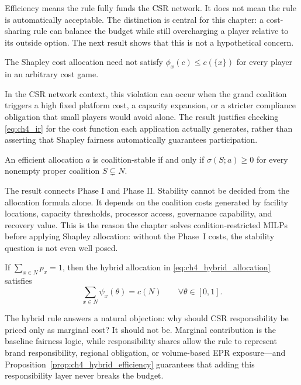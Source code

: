 Efficiency means the rule fully funds the CSR network. It does not mean the rule is automatically acceptable. The distinction is central for this chapter: a cost-sharing rule can balance the budget while still overcharging a player relative to its outside option. The next result shows that this is not a hypothetical concern.

\begin{proposition}
\label{prop:ch4_ir_not_automatic}
The Shapley cost allocation need not satisfy $\phi_x(c)\leq c(\{x\})$ for every player in an arbitrary cost game.
\end{proposition}

In the CSR network context, this violation can occur when the grand coalition triggers a high fixed platform cost, a capacity expansion, or a stricter compliance obligation that small players would avoid alone. The result justifies checking \eqref{eq:ch4_ir} for the cost function each application actually generates, rather than asserting that Shapley fairness automatically guarantees participation.

\begin{proposition}
\label{prop:ch4_core_depends_phase1}
An efficient allocation $a$ is coalition-stable if and only if $\sigma(S;a)\geq 0$ for every nonempty proper coalition $S\subsetneq N$.
\end{proposition}

The result connects Phase I and Phase II. Stability cannot be decided from the allocation formula alone. It depends on the coalition costs generated by facility locations, capacity thresholds, processor access, governance capability, and recovery value. This is the reason the chapter solves coalition-restricted MILPs before applying Shapley allocation: without the Phase~I costs, the stability question is not even well posed.

\begin{proposition}
\label{prop:ch4_hybrid_efficiency}
If $\sum_{x\in N}p_x=1$, then the hybrid allocation in \eqref{eq:ch4_hybrid_allocation} satisfies
\begin{equation}
\label{eq:ch4_hybrid_efficiency}
\sum_{x\in N}\psi_x(\theta)=c(N)
\qquad \forall \theta\in[0,1].
\end{equation}
\end{proposition}

The hybrid rule answers a natural objection: why should CSR responsibility be priced only as marginal cost? It should not be. Marginal contribution is the baseline fairness logic, while responsibility shares allow the rule to represent brand responsibility, regional obligation, or volume-based EPR exposure---and Proposition~\ref{prop:ch4_hybrid_efficiency} guarantees that adding this responsibility layer never breaks the budget.


